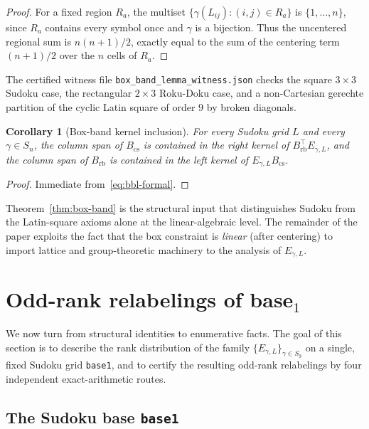 \documentclass[11pt,a4paper]{article}
\newtheorem{corollary}[theorem]{Corollary}
\theoremstyle{definition}
\theoremstyle{remark}
\newcommand{\Egamma}{E_{\gamma,L}}
\begin{document}
\begin{proof}
For a fixed region $R_a$, the multiset
$\{\gamma(L_{ij}):(i,j)\in R_a\}$ is $\{1,\dots,n\}$, since $R_a$
contains every symbol once and $\gamma$ is a bijection. Thus the
uncentered regional sum is $n(n+1)/2$, exactly equal to the sum of the
centering term $(n+1)/2$ over the $n$ cells of $R_a$.
\end{proof}

The certified witness file \texttt{box\_band\_lemma\_witness.json}
checks the square $3\times3$ Sudoku case, the rectangular $2\times3$
Roku-Doku case, and a non-Cartesian gerechte partition of the cyclic
Latin square of order $9$ by broken diagonals.

\begin{corollary}[Box-band kernel inclusion]\label{cor:bbl-kernel}
For every Sudoku grid $L$ and every $\gamma \in S_n$, the column span
of $B_{\mathrm{cs}}$ is contained in the right kernel of
$B_{\mathrm{rb}}^{\!\top} \Egamma$, and the column span of
$B_{\mathrm{rb}}$ is contained in the left kernel of
$\Egamma B_{\mathrm{cs}}$.
\end{corollary}

\begin{proof}
Immediate from~\eqref{eq:bbl-formal}.
\end{proof}

Theorem~\ref{thm:box-band} is the structural input that distinguishes
Sudoku from the Latin-square axioms alone at the linear-algebraic level. The
remainder of the paper exploits the fact that the box constraint is
\emph{linear} (after centering) to import lattice and group-theoretic
machinery to the analysis of $\Egamma$.

\section{\texorpdfstring{Odd-rank relabelings of base$_1$}{Odd-rank relabelings of base1}}\label{sec:base1}

We now turn from structural identities to enumerative facts. The
goal of this section is to describe the rank distribution of the
family $\{\Egamma\}_{\gamma \in S_9}$ on a single, fixed Sudoku grid
\texttt{base1}, and to certify the resulting odd-rank relabelings by
four independent exact-arithmetic routes.

\subsection{\texorpdfstring{The Sudoku base \texttt{base1}}{The Sudoku base base1}}\label{sec:base1-grid}
\end{document}
